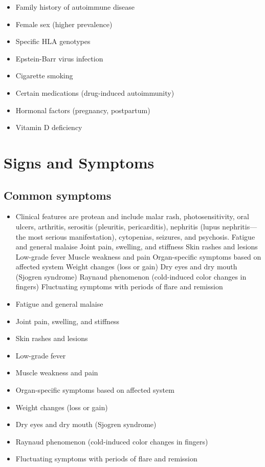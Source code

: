 \begin{itemize}[noitemsep]
  \item Family history of autoimmune disease
  \item Female sex (higher prevalence)
  \item Specific HLA genotypes
  \item Epstein-Barr virus infection
  \item Cigarette smoking
  \item Certain medications (drug-induced autoimmunity)
  \item Hormonal factors (pregnancy, postpartum)
  \item Vitamin D deficiency
\end{itemize}
\section{Signs and Symptoms}

\subsection{Common symptoms}
\begin{itemize}[noitemsep]
  \item Clinical features are protean and include malar rash, photosensitivity, oral ulcers, arthritis, serositis (pleuritis, pericarditis), nephritis (lupus nephritis---the most serious manifestation), cytopenias, seizures, and psychosis. Fatigue and general malaise Joint pain, swelling, and stiffness Skin rashes and lesions Low-grade fever Muscle weakness and pain Organ-specific symptoms based on affected system Weight changes (loss or gain) Dry eyes and dry mouth (Sjogren syndrome) Raynaud phenomenon (cold-induced color changes in fingers) Fluctuating symptoms with periods of flare and remission
  \item Fatigue and general malaise
  \item Joint pain, swelling, and stiffness
  \item Skin rashes and lesions
  \item Low-grade fever
  \item Muscle weakness and pain
  \item Organ-specific symptoms based on affected system
  \item Weight changes (loss or gain)
  \item Dry eyes and dry mouth (Sjogren syndrome)
  \item Raynaud phenomenon (cold-induced color changes in fingers)
  \item Fluctuating symptoms with periods of flare and remission
\end{itemize}

